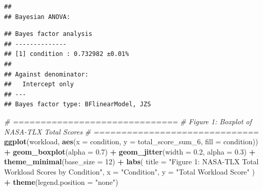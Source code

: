 \documentclass[
]{article}
\newenvironment{Shaded}{\begin{snugshade}}{\end{snugshade}}
\newcommand{\AttributeTok}[1]{\textcolor[rgb]{0.13,0.29,0.53}{#1}}
\newcommand{\CommentTok}[1]{\textcolor[rgb]{0.56,0.35,0.01}{\textit{#1}}}
\newcommand{\ControlFlowTok}[1]{\textcolor[rgb]{0.13,0.29,0.53}{\textbf{#1}}}
\newcommand{\DecValTok}[1]{\textcolor[rgb]{0.00,0.00,0.81}{#1}}
\newcommand{\FloatTok}[1]{\textcolor[rgb]{0.00,0.00,0.81}{#1}}
\newcommand{\FunctionTok}[1]{\textcolor[rgb]{0.13,0.29,0.53}{\textbf{#1}}}
\newcommand{\NormalTok}[1]{#1}
\newcommand{\OtherTok}[1]{\textcolor[rgb]{0.56,0.35,0.01}{#1}}
\newcommand{\SpecialCharTok}[1]{\textcolor[rgb]{0.81,0.36,0.00}{\textbf{#1}}}
\newcommand{\StringTok}[1]{\textcolor[rgb]{0.31,0.60,0.02}{#1}}
\begin{document}
\begin{verbatim}
## 
## Bayesian ANOVA:
\end{verbatim}

\begin{Shaded}
\end{Shaded}

\begin{verbatim}
## Bayes factor analysis
## --------------
## [1] condition : 0.732982 ±0.01%
## 
## Against denominator:
##   Intercept only 
## ---
## Bayes factor type: BFlinearModel, JZS
\end{verbatim}

\begin{Shaded}
\begin{Highlighting}[]
\CommentTok{\# ==============================}
\CommentTok{\# Figure 1: Boxplot of NASA{-}TLX Total Scores}
\CommentTok{\# ==============================}
\FunctionTok{ggplot}\NormalTok{(workload, }\FunctionTok{aes}\NormalTok{(}\AttributeTok{x =}\NormalTok{ condition, }\AttributeTok{y =}\NormalTok{ total\_score\_sum\_6, }\AttributeTok{fill =}\NormalTok{ condition)) }\SpecialCharTok{+}
  \FunctionTok{geom\_boxplot}\NormalTok{(}\AttributeTok{alpha =} \FloatTok{0.7}\NormalTok{) }\SpecialCharTok{+}
  \FunctionTok{geom\_jitter}\NormalTok{(}\AttributeTok{width =} \FloatTok{0.2}\NormalTok{, }\AttributeTok{alpha =} \FloatTok{0.3}\NormalTok{) }\SpecialCharTok{+}
  \FunctionTok{theme\_minimal}\NormalTok{(}\AttributeTok{base\_size =} \DecValTok{12}\NormalTok{) }\SpecialCharTok{+}
  \FunctionTok{labs}\NormalTok{(}
    \AttributeTok{title =} \StringTok{"Figure 1: NASA{-}TLX Total Workload Scores by Condition"}\NormalTok{,}
    \AttributeTok{x =} \StringTok{"Condition"}\NormalTok{,}
    \AttributeTok{y =} \StringTok{"Total Workload Score"}
\NormalTok{  ) }\SpecialCharTok{+}
  \FunctionTok{theme}\NormalTok{(}\AttributeTok{legend.position =} \StringTok{"none"}\NormalTok{)}
\end{Highlighting}
\end{Shaded}
\end{document}
